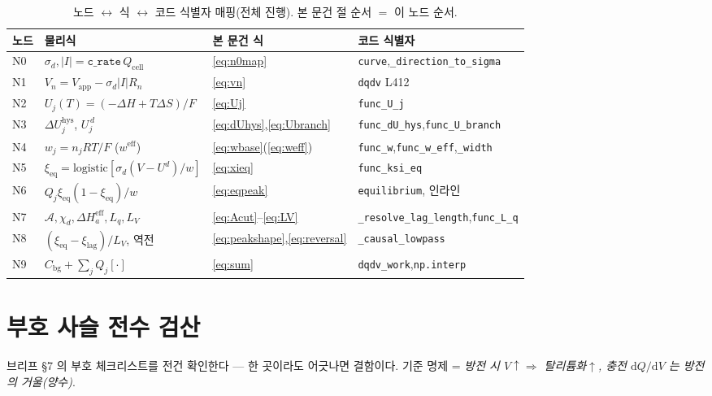 \documentclass[11pt,a4paper]{article}
\newcommand{\dd}{\mathrm{d}}
\newcommand{\eff}{\mathrm{eff}}
\newcommand{\eq}{\mathrm{eq}}
\newcommand{\app}{\mathrm{app}}
\newcommand{\cell}{\mathrm{cell}}
\newcommand{\bg}{\mathrm{bg}}
\newcommand{\hys}{\mathrm{hys}}
\newcommand{\code}[1]{\texttt{#1}}
\begin{document}
\begin{table}[t]
\centering
\renewcommand{\arraystretch}{1.3}
\caption{노드 $\leftrightarrow$ 식 $\leftrightarrow$ 코드 식별자 매핑(전체 진행). 본 문건 절 순서 $=$ 이 노드 순서.}
\label{tab:nodemap}
\begin{tabular}{l l l l}
\toprule
노드 & 물리식 & 본 문건 식 & 코드 식별자 \\
\midrule
N0 & $\sigma_d,|I|=\code{c\_rate}\,Q_\cell$ & \eqref{eq:n0map} & \code{curve},\code{\_direction\_to\_sigma} \\
N1 & $V_n=V_\app-\sigma_d|I|R_n$ & \eqref{eq:vn} & \code{dqdv} L412 \\
N2 & $U_j(T)=(-\Delta H+T\Delta S)/F$ & \eqref{eq:Uj} & \code{func\_U\_j} \\
N3 & $\Delta U_j^\hys$, $U_j^{\,d}$ & \eqref{eq:dUhys},\eqref{eq:Ubranch} & \code{func\_dU\_hys},\code{func\_U\_branch} \\
N4 & $w_j=n_jRT/F$ ($w^\eff$) & \eqref{eq:wbase}(\eqref{eq:weff}) & \code{func\_w},\code{func\_w\_eff},\code{\_width} \\
N5 & $\xi_\eq=\mathrm{logistic}[\sigma_d(V-U^d)/w]$ & \eqref{eq:xieq} & \code{func\_ksi\_eq} \\
N6 & $Q_j\xi_\eq(1-\xi_\eq)/w$ & \eqref{eq:eqpeak} & \code{equilibrium}, 인라인 \\
N7 & $\mathcal A,\chi_d,\Delta H_a^\eff,L_q,L_V$ & \eqref{eq:Acut}--\eqref{eq:LV} & \code{\_resolve\_lag\_length},\code{func\_L\_q} \\
N8 & $(\xi_\eq-\xi_\mathrm{lag})/L_V$, 역전 & \eqref{eq:peakshape},\eqref{eq:reversal} & \code{\_causal\_lowpass} \\
N9 & $C_\bg+\sum_jQ_j[\cdot]$ & \eqref{eq:sum} & \code{dqdv\_work},\code{np.interp} \\
\bottomrule
\end{tabular}
\end{table}

\section{부호 사슬 전수 검산}\label{sec:signcheck}
브리프 §7 의 부호 체크리스트를 전건 확인한다 --- 한 곳이라도 어긋나면 결함이다. 기준 명제 = \emph{방전 시
$V\!\uparrow\Rightarrow$ 탈리튬화$\uparrow$, 충전 $\dd Q/\dd V$ 는 방전의 거울(양수)}.
\end{document}
